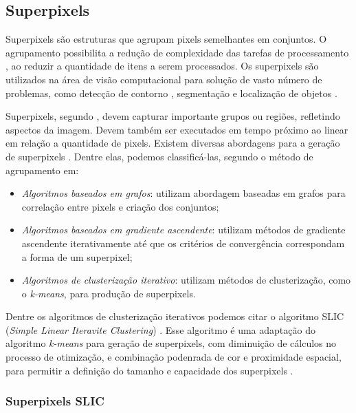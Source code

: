 \begin{document}

\subsection{Superpixels} \label{ssec:superpixels}

Superpixels são estruturas que agrupam pixels semelhantes em conjuntos. O agrupamento possibilita a redução de complexidade das tarefas de processamento \cite{SLIC}, ao reduzir a quantidade de itens a serem processados. Os superpixels são utilizados na área de visão computacional para solução de vasto número de problemas, como detecção de contorno \cite{CONTOUR}, segmentação \cite{SEG_MERGE} e localização de objetos \cite{SEG_LOCALIZ}.

Superpixels, segundo \cite{FELZENSWALB}, devem capturar importante grupos ou regiões, refletindo aspectos da imagem. Devem também ser executados em tempo próximo ao linear em relação a quantidade de pixels. Existem diversas abordagens para a geração de superpixels \cite{SLIC}. Dentre elas, podemos classificá-las, segundo o método de agrupamento em: 

\begin{itemize}
 \item \textit{Algoritmos baseados em grafos}: utilizam abordagem baseadas em grafos para correlação entre pixels e criação dos conjuntos;
 \item \textit{Algoritmos baseados em gradiente ascendente}: utilizam métodos de gradiente ascendente iterativamente até que os critérios de convergência correspondam a forma de um superpixel; 
 \item \textit{Algoritmos de clusterização iterativo}: utilizam métodos de clusterização, como o \textit{k-means}, para produção de superpixels.
\end{itemize}

Dentre os algoritmos de clusterização iterativos podemos citar o algoritmo SLIC (\textit{Simple Linear Iteravite Clustering}) \cite{SLIC}. Esse algoritmo é uma adaptação do algoritmo \textit{k-means} para geração de superpixels, com diminuição de cálculos no processo de otimização, e combinação podenrada de cor e proximidade espacial, para permitir a definição do tamanho e capacidade dos superpixels \cite{SLIC}.

\subsubsection{Superpixels SLIC} \label{sssec:slic}
\end{document}
